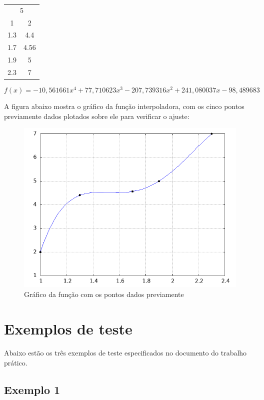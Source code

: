\documentclass{article}
\begin{document}
\begin{table}[H]
\centering
\begin{tabular}{cc}
\multicolumn{2}{c}{5} \\
1   & 2 \\
1.3 & 4.4 \\
1.7 & 4.56 \\
1.9 & 5 \\
2.3 & 7 \\
\end{tabular}
\end{table}

\begin{equation*}
f(x) = -10{,}561661x^4 + 77{,}710623x^3 - 207{,}739316x^2 + 241{,}080037x - 98{,}489683
\end{equation*}

A figura abaixo mostra o gráfico da função interpoladora, com os cinco pontos previamente dados plotados sobre ele para verificar o ajuste:

\begin{figure}[H]
    \centering
    \includegraphics[width=0.5\linewidth]{resultado1.png}
    \caption{Gráfico da função com os pontos dados previamente}
    \label{fig:saida}
\end{figure}

\section{Exemplos de teste}
\paragraph{} Abaixo estão os três exemplos de teste especificados no documento do trabalho prático.

    \subsection{Exemplo 1}  
\end{document}
